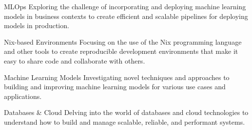
\begin{cvopensource}

	\cvproject
	{MLOps} %
	{
		Exploring the challenge of incorporating and deploying machine learning models in business contexts to create efficient and scalable pipelines for deploying models in production.
	}

	\cvproject
	{Nix-based Environments} %
	{
		Focusing on the use of the Nix programming language and other tools to create reproducible development environments that make it easy to share code and collaborate with others.
	}

	\cvproject
	{Machine Learning Models} %
	{
		Investigating novel techniques and approaches to building and improving machine learning models for various use cases and applications.
	}

	\cvproject
	{Databases \& Cloud} %
	{
		Delving into the world of databases and cloud technologies to understand how to build and manage scalable, reliable, and performant systems.
	}

\end{cvopensource}
